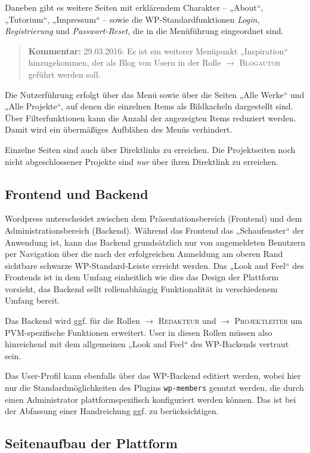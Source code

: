 \documentclass[a4paper,11pt]{article}
\newcommand{\Kommentar}[1]{
  \begin{quote}\textbf{Kommentar:} #1 \end{quote}
}
\newcommand{\glossar}[1]{{$\to$ \textsc{#1}}}
\begin{document}
Daneben gibt es weitere Seiten mit erklärendem Charakter -- „About“,
„Tutorium“, „Impressum“ -- sowie die WP-Standardfunktionen \emph{Login},
\emph{Registrierung} und \emph{Passwort-Reset}, die in die Menüführung
eingeordnet sind.

\Kommentar{29.03.2016: Es ist ein weiterer Menüpunkt „Inspiration“
  hinzugekommen, der als Blog von Usern in der Rolle \glossar{Blogautor}
  geführt werden soll. }

Die Nutzerführung erfolgt über das Menü sowie über die Seiten „Alle Werke“ und
„Alle Projekte“, auf denen die einzelnen Items als Bildkacheln dargestellt
sind. Über Filterfunktionen kann die Anzahl der angezeigten Items reduziert
werden.  Damit wird ein übermäßiges Aufblähen des Menüs verhindert.

Einzelne Seiten sind auch über Direktlinks zu erreichen.  Die Projektseiten
noch nicht abgeschlossener Projekte sind \emph{nur} über ihren Direktlink zu
erreichen.

\subsection{Frontend und Backend}

Wordpress unterscheidet zwischen dem Präsentationsbereich (Frontend) und dem
Administrationsbereich (Backend).  Während das Frontend das „Schaufenster“ der
Anwendung ist, kann das Backend grundsätzlich nur von angemeldeten Benutzern
per Navigation über die nach der erfolgreichen Anmeldung am oberen Rand
sichtbare schwarze WP-Standard-Leiste erreicht werden.  Das „Look and Feel“ des
Frontends ist in dem Umfang einheitlich wie dies das Design der Plattform
vorsieht, das Backend sellt rollenabhängig Funktionalität in verschiedenem
Umfang bereit.

Das Backend wird ggf. für die Rollen \glossar{Redakteur} und
\glossar{Projektleiter} um PVM-spezifische Funktionen erweitert.  User in
diesen Rollen müssen also hinreichend mit dem allgemeinen „Look and Feel“ des
WP-Backends vertraut sein.

Das User-Profil kann ebenfalls über das WP-Backend editiert werden, wobei hier
nur die Standardmöglichkeiten des Plugins \texttt{wp-members} genutzt werden,
die durch einen Administrator plattformspezifisch konfiguriert werden können.
Das ist bei der Abfassung einer Handreichung ggf. zu berücksichtigen. 

\subsection{Seitenaufbau der Plattform}
\end{document}

